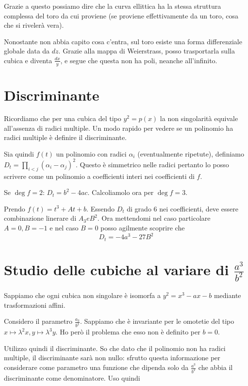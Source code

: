 	Grazie a questo possiamo dire che la curva ellittica ha la stessa struttura complessa del toro da cui proviene (se proviene effettivamente da un toro, cosa che si rivelerà vera).
	
	\begin{osservazione}
		Nonostante non abbia capito cosa c'entra, sul toro esiste una forma differenziale globale data da $dz$. Grazie alla mappa di Weierstrass, posso trasportarla sulla cubica e diventa $\frac{dx}y$, e segue che questa non ha poli, neanche all'infinito.
	
	\end{osservazione}
	
	\section{Discriminante}
	
	Ricordiamo che per una cubica del tipo $y^2=p(x)$ la non singolarità equivale all'assenza di radici multiple. Un modo rapido per vedere se un polinomio ha radici multiple è definire il discriminante.
	
	Sia quindi $f(t)$ un polinomio con radici $\alpha_i$ (eventualmente ripetute), definiamo $D_t=\prod_{i<j} (\alpha_i - \alpha_j)^2$. Questo è simmetrico nelle radici pertanto lo posso scrivere come un polinomio a coefficienti interi nei coefficienti di $f$.
	
	Se $\deg f=2$: $D_t= b^2-4ac$. Calcoliamolo ora per $\deg f=3$.

	Prendo $f(t)=t^3+At+b$. Essendo $D_t$ di grado 6 nei coefficienti, deve essere combinazione linerare di $A_3 e B^2$. Ora mettendomi nel caso particolare $A=0,B=-1$ e nel caso $B=0$ posso agilmente scoprire che 
	\[
		D_t=-4a^3-27B^2
	\]
	
	\section{Studio delle cubiche al variare di $\frac{a^3}{b^2}$}
	
	Sappiamo che ogni cubica non singolare è isomorfa a $y^2=x^3-ax-b$ mediante trasformazioni affini.
	
	Considero il parametro $\frac{a_3}{b^2}$. Sappiamo che è invariante per le omotetie del tipo $x\mapsto \lambda^2x, y\mapsto\lambda^3y$. Ho però il problema che esso non è definito per $b=0$.

	Utilizzo quindi il discriminante. So che dato che il polinomio non ha radici multiple, il discriminante sarà non nullo: sfrutto questa informazione per considerare come parametro una funzione che dipenda solo da $\frac{a^3}{b^2}$ che abbia il discriminante come denominatore. Uso quindi
	
